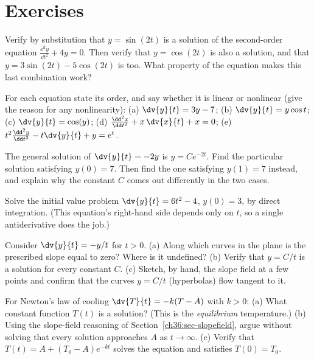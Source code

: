 \section*{Exercises}

\begin{exercise}
\label{ch36:ex-verify1}
Verify by substitution that $y = \sin(2t)$ is a solution of the second-order equation $\frac{\dd^2 y}{\dd t^2} + 4y = 0$. Then verify that $y = \cos(2t)$ is also a solution, and that $y = 3\sin(2t) - 5\cos(2t)$ is too. What property of the equation makes this last combination work?
\end{exercise}

\begin{exercise}
\label{ch36:ex-classify1}
For each equation state its order, and say whether it is linear or nonlinear (give the reason for any nonlinearity):
(a) $\dv{y}{t} = 3y - 7$; \quad
(b) $\dv{y}{t} = y\cos t$; \quad
(c) $\dv{y}{t} = \cos(y)$; \quad
(d) $\frac{\dd^2 x}{\dd t^2} + x\,\dv{x}{t} + x = 0$; \quad
(e) $t^2\frac{\dd^2 y}{\dd t^2} - t\dv{y}{t} + y = e^t$.
\end{exercise}

\begin{exercise}
\label{ch36:ex-ivp1}
The general solution of $\dv{y}{t} = -2y$ is $y = Ce^{-2t}$. Find the particular solution satisfying $y(0) = 7$. Then find the one satisfying $y(1) = 7$ instead, and explain why the constant $C$ comes out differently in the two cases.
\end{exercise}

\begin{exercise}
\label{ch36:ex-integrate1}
Solve the initial value problem $\dv{y}{t} = 6t^2 - 4$, $y(0) = 3$, by direct integration. (This equation's right-hand side depends only on $t$, so a single antiderivative does the job.)
\end{exercise}

\begin{exercise}
\label{ch36:ex-slopefield1}
Consider $\dv{y}{t} = -y/t$ for $t > 0$.
(a) Along which curves in the plane is the prescribed slope equal to zero? Where is it undefined?
(b) Verify that $y = C/t$ is a solution for every constant $C$.
(c) Sketch, by hand, the slope field at a few points and confirm that the curves $y = C/t$ (hyperbolas) flow tangent to it.
\end{exercise}

\begin{exercise}
\label{ch36:ex-attractor1}
For Newton's law of cooling $\dv{T}{t} = -k(T - A)$ with $k>0$:
(a) What constant function $T(t)$ is a solution? (This is the \emph{equilibrium} temperature.)
(b) Using the slope-field reasoning of Section~\ref{ch36:sec-slopefield}, argue without solving that every solution approaches $A$ as $t\to\infty$.
(c) Verify that $T(t) = A + (T_0 - A)e^{-kt}$ solves the equation and satisfies $T(0) = T_0$.
\end{exercise}

